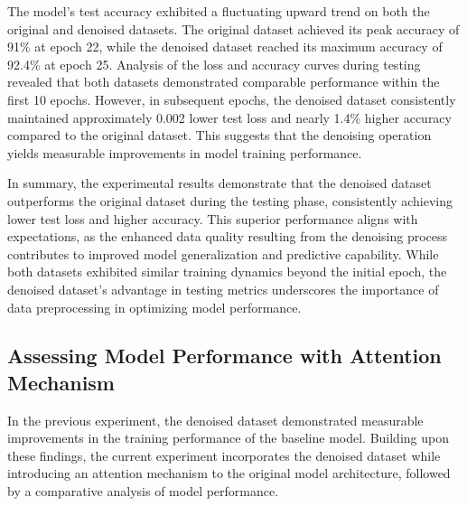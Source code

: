 \documentclass[conference]{IEEEtran}
\begin{document}
The model's test accuracy exhibited a fluctuating upward trend on both the original and denoised datasets. The original dataset achieved its peak accuracy of 91\% at epoch 22, while the denoised dataset reached its maximum accuracy of 92.4\% at epoch 25. Analysis of the loss and accuracy curves during testing revealed that both datasets demonstrated comparable performance within the first 10 epochs. However, in subsequent epochs, the denoised dataset consistently maintained approximately 0.002 lower test loss and nearly 1.4\% higher accuracy compared to the original dataset. This suggests that the denoising operation yields measurable improvements in model training performance.

In summary, the experimental results demonstrate that the denoised dataset outperforms the original dataset during the testing phase, consistently achieving lower test loss and higher accuracy. This superior performance aligns with expectations, as the enhanced data quality resulting from the denoising process contributes to improved model generalization and predictive capability. While both datasets exhibited similar training dynamics beyond the initial epoch, the denoised dataset's advantage in testing metrics underscores the importance of data preprocessing in optimizing model performance.

\subsection{Assessing Model Performance with Attention Mechanism}
In the previous experiment, the denoised dataset demonstrated measurable improvements in the training performance of the baseline model. Building upon these findings, the current experiment incorporates the denoised dataset while introducing an attention mechanism to the original model architecture, followed by a comparative analysis of model performance.
\end{document}
